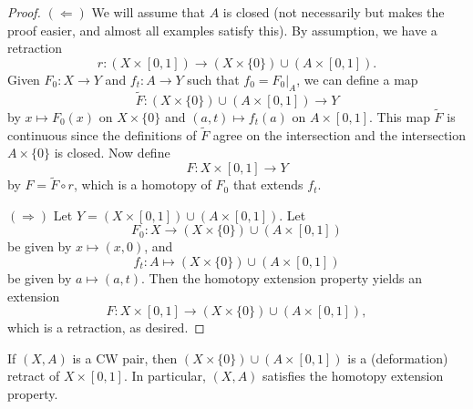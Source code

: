 \begin{proof}
  $(\Leftarrow)$ We will assume that $A$ is closed
  (not necessarily but makes the proof easier, and almost
  all examples satisfy this). By assumption, we
  have a retraction
  \[
    r : (X \times [0, 1]) \to (X \times \{0\}) \cup (A \times [0, 1]).
  \]
  Given $F_0 : X \to Y$ and $f_t : A \to Y$
  such that $f_0 = F_0|_A$, we can define a map
  \[
    \widetilde{F} : (X \times \{0\}) \cup (A \times [0, 1]) \to Y
  \]
  by $x \mapsto F_0(x)$ on $X \times \{0\}$ and
  $(a, t) \mapsto f_t(a)$ on $A \times [0, 1]$.
  This map $\widetilde{F}$ is continuous since the definitions of
  $\widetilde{F}$ agree on the intersection and the
  intersection $A \times \{0\}$ is closed. Now define
  \[F : X \times [0, 1] \to Y\]
  by $F = \widetilde{F} \circ r$,
  which is a homotopy of $F_0$ that extends $f_t$.

  $(\Rightarrow)$ Let $Y = (X \times [0, 1]) \cup (A \times [0, 1])$. Let
  \[F_0 : X \to (X \times \{0\}) \cup (A \times [0, 1])\]
  be given by $x \mapsto (x, 0)$, and
  \[
    f_t : A \mapsto (X \times \{0\}) \cup (A \times [0, 1])
  \]
  be given by $a \mapsto (a, t)$. Then the homotopy
  extension property yields an extension
  \[F : X \times [0, 1] \to (X \times \{0\}) \cup (A \times [0, 1]),\]
  which is a retraction, as desired.
\end{proof}

\begin{lemma}\label{lem:lemma-5}
  If $(X, A)$ is a CW pair, then
  $(X \times \{0\}) \cup (A \times [0, 1])$ is a
  (deformation) retract of $X \times [0, 1]$.
  In particular, $(X, A)$ satisfies the homotopy
  extension property.
\end{lemma}

